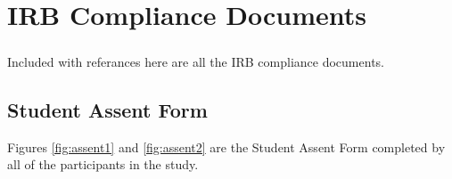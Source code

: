 \chapter{IRB Compliance Documents}
\paragraph{}
Included with referances here are all the IRB compliance documents.

\section{Student Assent Form} \label{sec:student_assent}
	
	Figures \ref{fig:assent1} and \ref{fig:assent2} are the Student Assent Form completed by all of the participants in the study. 

        
	
	
